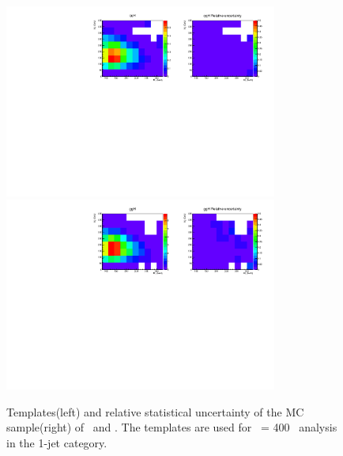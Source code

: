 % 
% 
\begin{figure}[htp]
\centering
\includegraphics[width=0.8\textwidth]{figures/2dtemplate_qqH_mH400_1j.pdf}
\includegraphics[width=0.8\textwidth]{figures/2dtemplate_ggH_mH400_1j.pdf}
\caption{Templates(left) and relative statistical uncertainty of the MC sample(right) 
of \qqH\ and \ggH. 
The templates are used for \mHi\ = 400 \GeV\ analysis in the 1-jet category.}
\label{fig:2dtemplate_400_1j_1}
\end{figure}

